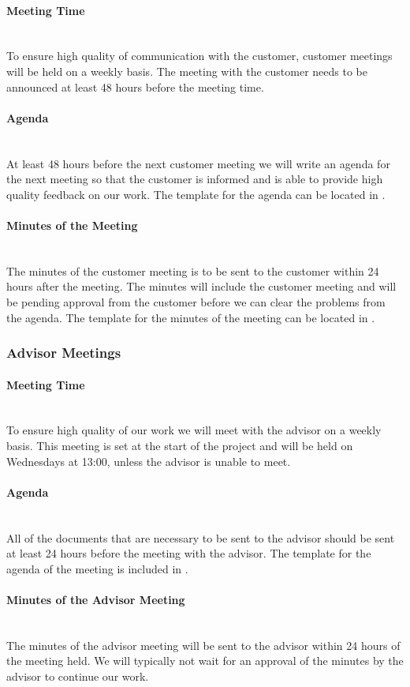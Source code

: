 \documentclass[../document.tex]{subfiles}
\begin{document}
\paragraph{Meeting Time} \ \\
To ensure high quality of communication with the customer, customer meetings will be held on a weekly basis. The meeting with the customer needs to be announced at least 48 hours before the meeting time.

\paragraph{Agenda} \ \\
At least 48 hours before the next customer meeting we will write an agenda for the next meeting so that the customer is informed and is able to provide high quality feedback on our work. The template for the agenda can be located in .

\paragraph{Minutes of the Meeting} \ \\
The minutes of the customer meeting is to be sent to the customer within 24 hours after the meeting. The minutes will include the customer meeting and will be pending approval from the customer before we can clear the problems from the agenda. The template for the minutes of the meeting can be located in .

\subsubsection{Advisor Meetings}
\paragraph{Meeting Time} \ \\
To ensure high quality of our work we will meet with the advisor on a weekly basis. This meeting is set at the start of the project and will be held on Wednesdays at 13:00, unless the advisor is unable to meet.

\paragraph{Agenda} \ \\
All of the documents that are necessary to be sent to the advisor should be sent at least 24 hours before the meeting with the advisor. The template for the agenda of the meeting is included in .

\paragraph{Minutes of  the Advisor Meeting} \ \\
The minutes of the advisor meeting will be sent to the advisor within 24 hours of the meeting held. We will typically not wait for an approval of the minutes by the advisor to continue our work.
\end{document}
